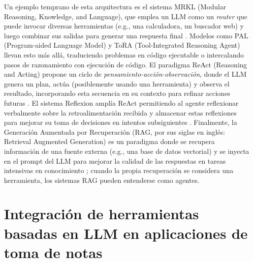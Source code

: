 Un ejemplo temprano de esta arquitectura es el sistema MRKL (Modular Reasoning, Knowledge, and Language), que emplea un LLM como un \textit{router} que puede invocar diversas herramientas (e.g., una calculadora, un buscador web) y luego combinar sus salidas para generar una respuesta final \citep{karpasMRKLSystemsModular2022}. Modelos como PAL (Program-aided Language Model) \citep{gaoPALProgramaidedLanguage2023} y ToRA (Tool-Integrated Reasoning Agent) \citep{gouToRAToolIntegratedReasoning2024} llevan esto más allá, traduciendo problemas en código ejecutable o intercalando pasos de razonamiento con ejecución de código. El paradigma ReAct (Reasoning and Acting) propone un ciclo de \textit{pensamiento-acción-observación}, donde el LLM genera un plan, actúa (posiblemente usando una herramienta) y observa el resultado, incorporando esta secuencia en su contexto para refinar acciones futuras \citep{yaoReActSynergizingReasoning2023}. El sistema Reflexion amplía ReAct permitiendo al agente reflexionar verbalmente sobre la retroalimentación recibida y almacenar estas reflexiones para mejorar su toma de decisiones en intentos subsiguientes \citep{shinnReflexionLanguageAgents2023}. Finalmente, la Generación Aumentada por Recuperación (RAG, por sus siglas en inglés: Retrieval Augmented Generation) es un paradigma donde se recupera información de una fuente externa (e.g., una base de datos vectorial) y se inyecta en el prompt del LLM para mejorar la calidad de las respuestas en tareas intensivas en conocimiento \citep{lewisRetrievalAugmentedGenerationKnowledgeIntensive2021}; cuando la propia recuperación se considera una herramienta, los sistemas RAG pueden entenderse como agentes.

\section{Integración de herramientas basadas en LLM en aplicaciones de toma de notas}
\label{sec:integracion_herramientas_llm}

